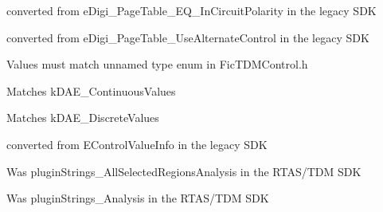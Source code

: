 \begin{DoxyRefList}
 converted from {\ttfamily e\+Digi\+\_\+\+Page\+Table\+\_\+\+EQ\+\_\+\+In\+Circuit\+Polarity} in the legacy SDK 
\item[Member \mbox{\hyperlink{a00524_aa169208a2ce713fa021e20deb2eaf608a1a0d975a333d3aee81b22f878697e9c4}{AAX\+\_\+e\+Page\+Table\+\_\+\+Use\+Alternate\+Control}} ]\label{a00880__porting_notes000026}%
%
 converted from {\ttfamily e\+Digi\+\_\+\+Page\+Table\+\_\+\+Use\+Alternate\+Control} in the legacy SDK 
\item[Member \mbox{\hyperlink{a00524_ace1a00189fa05277582cfb1e8ad48014}{AAX\+\_\+\+EParameter\+Type}} ]\label{a00880__porting_notes000010}%
%
 Values must match unnamed type enum in Fic\+TDMControl.\+h 
\item[Member \mbox{\hyperlink{a00524_a4cd0f189daa9a60cf36883c56344bb2eade82e7d1b5012a76837b70c1a9b92168}{AAX\+\_\+e\+Parameter\+Type\+\_\+\+Continuous}} ]\label{a00880__porting_notes000023}%
%
 Matches {\ttfamily k\+DAE\+\_\+\+Continuous\+Values}  
\item[Member \mbox{\hyperlink{a00524_a4cd0f189daa9a60cf36883c56344bb2ea2a3c9939ef1fa8b8f729152c35c42740}{AAX\+\_\+e\+Parameter\+Type\+\_\+\+Discrete}} ]\label{a00880__porting_notes000022}%
%
 Matches {\ttfamily k\+DAE\+\_\+\+Discrete\+Values}  
\item[Member \mbox{\hyperlink{a00524_aa169208a2ce713fa021e20deb2eaf608}{AAX\+\_\+\+EParameter\+Value\+Info\+Selector}} ]\label{a00880__porting_notes000011}%
%
 converted from {\ttfamily EControl\+Value\+Info} in the legacy SDK  
\item[Member \mbox{\hyperlink{a00524_a86f7310877399d9d4d2ea4863d472476a18ce96adcc5420f19c7247bde5718490}{AAX\+\_\+e\+Plug\+In\+Strings\+\_\+\+All\+Selected\+Regions\+Analysis}} ]\label{a00880__porting_notes000016}%
%
 Was plugin\+Strings\+\_\+\+All\+Selected\+Regions\+Analysis in the RTAS/\+TDM SDK  
\item[Member \mbox{\hyperlink{a00524_a86f7310877399d9d4d2ea4863d472476a452cb68d82f40ff3464752eed92543ed}{AAX\+\_\+e\+Plug\+In\+Strings\+\_\+\+Analysis}} ]\label{a00880__porting_notes000012}%
%
 Was plugin\+Strings\+\_\+\+Analysis in the RTAS/\+TDM SDK  
\item[Member \mbox{\hyperlink{a00524_a86f7310877399d9d4d2ea4863d472476a9b49eb0306daf949d9bf4a5d4b22ada0}{AAX\+\_\+e\+Plug\+In\+Strings\+\_\+\+Bypass}} ]\label{a00880__porting_notes000020}%

\end{DoxyRefList}
